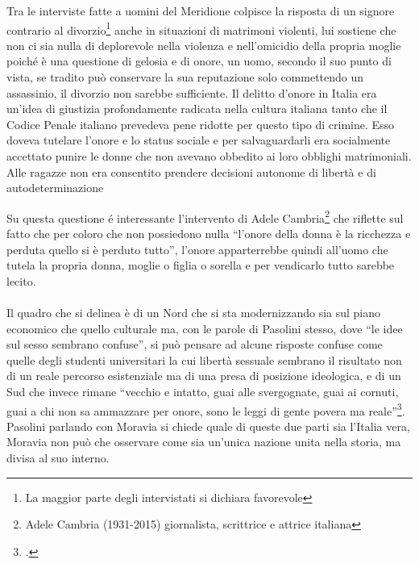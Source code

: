 Tra le interviste fatte a uomini del Meridione colpisce la risposta di un signore contrario al divorzio\footnote{La maggior parte degli intervistati si dichiara favorevole} anche in situazioni di matrimoni violenti, lui sostiene che non ci sia nulla di deplorevole nella violenza e nell'omicidio della propria moglie poiché è una questione di gelosia e di onore, un uomo, secondo il suo punto di vista, se tradito può conservare la sua reputazione solo commettendo un assassinio, il divorzio non sarebbe sufficiente.
Il delitto d'onore in Italia era un'idea di giustizia profondamente radicata nella cultura italiana tanto che il Codice Penale italiano prevedeva pene ridotte per questo tipo di crimine.
Esso doveva tutelare l'onore e lo status sociale e per salvaguardarli era socialmente accettato punire le donne che non avevano obbedito ai loro obblighi matrimoniali.
Alle ragazze non era consentito prendere decisioni autonome di libertà e di autodeterminazione

Su questa questione é interessante l'intervento di Adele Cambria\footnote{Adele Cambria (1931-2015) giornalista, scrittrice e attrice italiana} che riflette sul fatto che per coloro che non possiedono nulla \enquote{l'onore della donna è la ricchezza e perduta quello si è perduto tutto}, l'onore apparterrebbe quindi all'uomo che tutela la propria donna, moglie o figlia o sorella e per vendicarlo tutto sarebbe lecito.

\paragraph{}Il quadro che si delinea è di un Nord che si sta modernizzando sia sul piano economico che quello culturale ma, con le parole di Pasolini stesso, dove \enquote{le idee sul sesso sembrano confuse}, si può pensare ad alcune risposte confuse come quelle degli studenti universitari la cui libertà sessuale sembrano il risultato non di un reale percorso esistenziale ma di una presa di posizione ideologica, e di un Sud che invece rimane \enquote{vecchio e intatto, guai alle svergognate, guai ai cornuti, guai a chi non sa ammazzare per onore, sono le leggi di gente povera ma reale}\footcite{Comizi}.
\\Pasolini parlando con Moravia si chiede quale di queste due parti sia l'Italia vera, Moravia non può che osservare come sia un'unica nazione unita nella storia, ma divisa al suo interno.

